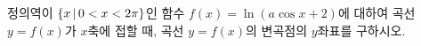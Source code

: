 정의역이 $\{x\mkern3mu |\mkern3mu 0<x<2\pi\}$인 함수 $f(x)=\ln(a\cos x+2)$에 대하여 곡선 $y=f(x)$가 $x$축에 접할 때, 곡선 $y=f(x)$의 변곡점의 $y$좌표를 구하시오. 

